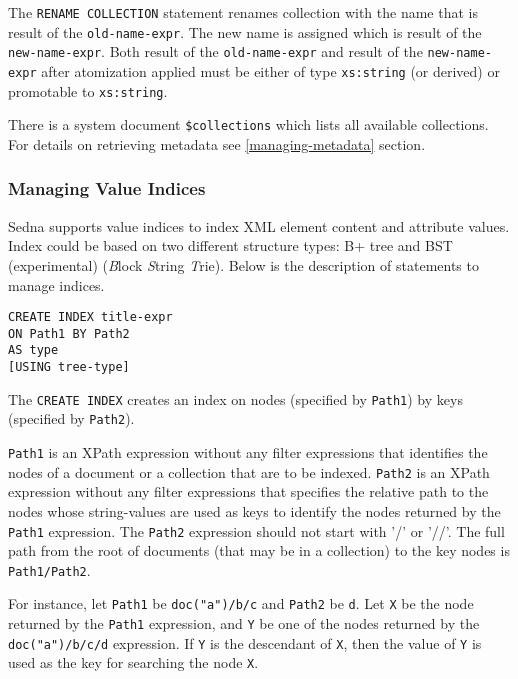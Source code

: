\documentclass[a4paper,12pt]{article}
\begin{document}
The \verb!RENAME COLLECTION! statement renames collection with the name that is
result of the \verb!old-name-expr!. The new name is assigned which is result of
the \verb!new-name-expr!. Both result of the \verb!old-name-expr! and result of
the \verb!new-name-expr! after atomization applied must be either of type
\verb!xs:string! (or derived) or promotable to \verb!xs:string!.

There is a system document \verb!$collections! which lists all available
collections. For details on retrieving metadata see \ref{managing-metadata}
section.


\subsubsection{Managing Value Indices}
\label{sec:managing-value-indices}

Sedna supports value indices to index XML element content and attribute values.
Index could be based on two different structure types: B+ tree and BST
(experimental) (\emph{B}lock \emph{S}tring \emph{T}rie). Below is the
description of statements to manage indices.

\begin{verbatim}
CREATE INDEX title-expr
ON Path1 BY Path2
AS type
[USING tree-type]
\end{verbatim}

The \verb!CREATE INDEX! creates an index on nodes (specified by \verb!Path1!) by
keys (specified by \verb!Path2!).

\verb!Path1! is an XPath expression without any filter expressions that
identifies the nodes of a document or a collection that are to be indexed.
\verb!Path2! is an XPath expression without any filter expressions that
specifies the relative path to the nodes whose string-values are used as keys to
identify the nodes returned by the \verb!Path1! expression. The \verb!Path2!
expression should not start with '/' or '//'. The full path from the root of
documents (that may be in a collection) to the key nodes is \verb!Path1/Path2!.

For instance, let \verb!Path1! be \verb!doc("a")/b/c! and \verb!Path2! be
\verb!d!. Let \verb!X! be the node returned by the \verb!Path1! expression, and
\verb!Y! be one of the nodes returned by the \verb!doc("a")/b/c/d! expression.
If \verb!Y! is the descendant of \verb!X!, then the value of \verb!Y! is used as
the key for searching the node \verb!X!.
\end{document}
